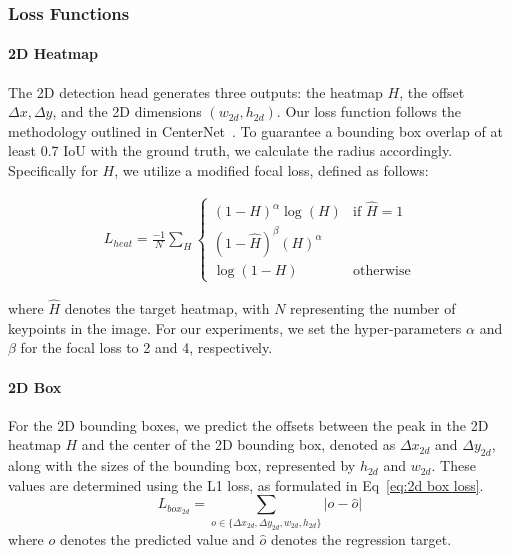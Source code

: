 \documentclass[journal]{IEEEtran}
\begin{document}
	\subsubsection{Loss Functions}
	\paragraph{2D Heatmap} The 2D detection head generates three outputs: the heatmap $H$, the offset $\Delta x, \Delta y$, and the 2D dimensions $(w_{2d}, h_{2d})$. Our loss function follows the methodology outlined in CenterNet~\cite{centernet}. To guarantee a bounding box overlap of at least 0.7 IoU with the ground truth, we calculate the radius accordingly. Specifically for $H$, we utilize a modified focal loss, defined as follows:
	
	\begin{equation}
		\begin{split}
		L_{heat}=\frac{-1}N\sum_{H}\begin{cases}(1-H)^\alpha\log(H)&\text{if }\hat{H}=1\\(1-\hat{H})^\beta({H})^\alpha \\ \log(1-{H}) &\text{otherwise}\end{cases}
		\label{eq:heatmap loss}
		\end{split}
	\end{equation}

	where $\hat{H}$ denotes the target heatmap, with $N$ representing the number of keypoints in the image. For our experiments, we set the hyper-parameters $\alpha$ and $\beta$ for the focal loss to 2 and 4, respectively.
	
	\paragraph{2D Box} 
	For the 2D bounding boxes, we predict the offsets between the peak in the 2D heatmap $H$ and the center of the 2D bounding box, denoted as $\Delta x_{2d}$ and $\Delta y_{2d}$, along with the sizes of the bounding box, represented by $h_{2d}$ and $w_{2d}$. These values are determined using the L1 loss, as formulated in Eq~\eqref{eq:2d box loss}.
	\begin{equation}
		L_{box_{2d}} = \sum_{o\in \{\Delta x_{2d}, \Delta y_{2d}, w_{2d}, h_{2d}\}}\lvert o - \hat{o} \rvert
		\label{eq:2d box loss}
	\end{equation}
	where $o$ denotes the predicted value and $\hat{o}$ denotes the regression target.
\end{document}
